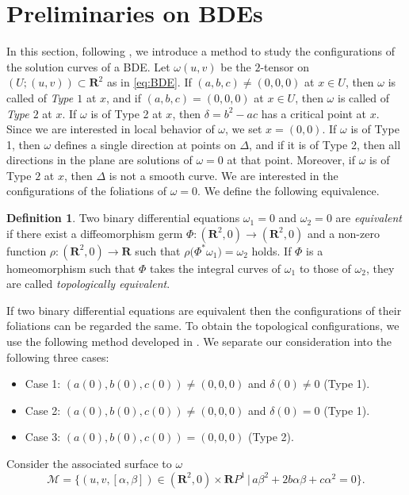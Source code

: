 \documentclass[a4paper, 12pt]{article}
\theoremstyle{definition}
\newtheorem{definition}[theorem]{Definition}
\numberwithin{equation}{section}
\begin{document}
\section{Preliminaries on BDEs}
In this section, following  \cite{BTbinary,BTimplicit},
we introduce a method to study 
the configurations of the solution curves of
a BDE.
Let $\omega(u,v)$ be 
the $2$-tensor on $(U;(u,v))\subset {\boldsymbol{R}}^2$
as in \eqref{eq:BDE}.
If $(a,b,c)\ne(0,0,0)$ at $x\in U$, then 
$\omega$ is called of {\em Type\/ $1$} at $x$,
and if $(a,b,c)=(0,0,0)$ at $x\in U$, then 
$\omega$ is called of  {\em Type\/ $2$} at $x$.
If $\omega$ is of Type 2 at $x$,
then $\delta=b^2-ac$ has a critical point at $x$.
Since we are interested in local behavior of $\omega$,
we set $x=(0,0)$.
If $\omega$ is of 
Type 1, then $\omega$ defines a single direction at points on
$\Delta$, and if it is
of Type 2, then all directions
in the plane are solutions of $\omega=0$ at that point.
Moreover, if $\omega$ is of Type $2$ at $x$, then
$\Delta$ is not a smooth curve.
We are interested in 
the configurations of the foliations 
of $\omega=0$.
We define the following equivalence.
\begin{definition}
Two binary differential equations 
$\omega_1=0$ and $\omega_2=0$
are {\em equivalent\/} if
there exist a diffeomorphism germ
$\Phi:({\boldsymbol{R}}^2,0)\to({\boldsymbol{R}}^2,0)$
and a non-zero function $\rho:({\boldsymbol{R}}^2,0)\to{\boldsymbol{R}}$ such that
$\rho\big(\Phi^*\omega_1\big)=\omega_2$
holds.
If $\Phi$ is a homeomorphism
such that $\Phi$ takes the integral curves of $\omega_1$ 
to those of $\omega_2$,
they are called {\em topologically equivalent}.
\end{definition}
If two binary differential equations are equivalent then 
the configurations of their
foliations can be regarded the same.
To obtain the topological configurations,
we use the following method developed in 
\cite{BTbinary,BTimplicit,ggs,guinez1,faridtari,faridsurvey}.
We separate our consideration into the following three cases:
\begin{itemize}
\item Case 1: $(a(0),b(0),c(0))\ne(0,0,0)$ and $\delta(0)\ne0$ 
(Type 1).
\item Case 2: $(a(0),b(0),c(0))\ne(0,0,0)$ and $\delta(0)=0$ (Type 1).
\item Case 3: $(a(0),b(0),c(0))=(0,0,0)$ (Type 2).
\end{itemize}
Consider the associated surface to $\omega$
$$
{\mathcal{M}}=\{(u,v,[\alpha,\beta])\in({\boldsymbol{R}}^2,0)\times {\boldsymbol{R}} P^1\,|\,
a\beta^2+2b\alpha\beta+c\alpha^2=0\}.
$$
\end{document}
